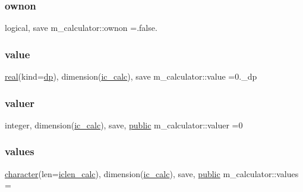 \mbox{\label{namespacem__calculator_a64ba59ad27c2751b72b5880500985b56}} 
\subsubsection{\texorpdfstring{ownon}{ownon}}
{\footnotesize\ttfamily logical, save m\+\_\+calculator\+::ownon =.false.\hspace{0.3cm}{\ttfamily [private]}}

\mbox{\label{namespacem__calculator_aeaff519ae0f18ac99095c955fbe12f9d}} 
\subsubsection{\texorpdfstring{value}{value}}
{\footnotesize\ttfamily \hyperlink{read__watch_83_8txt_abdb62bde002f38ef75f810d3a905a823}{real}(kind=\hyperlink{namespacem__calculator_aefb5a6c3001bb0f09ed82decb6def950}{dp}), dimension(\hyperlink{namespacem__calculator_a462e5bf8d038196149ba96c22a614284}{ic\+\_\+calc}), save m\+\_\+calculator\+::value =0.\+\_\+dp\hspace{0.3cm}{\ttfamily [private]}}

\mbox{\label{namespacem__calculator_a7d1d50fdb797826d4722b3a6d2e38442}} 
\subsubsection{\texorpdfstring{valuer}{valuer}}
{\footnotesize\ttfamily integer, dimension(\hyperlink{namespacem__calculator_a462e5bf8d038196149ba96c22a614284}{ic\+\_\+calc}), save, \hyperlink{M__stopwatch_83_8txt_a2f74811300c361e53b430611a7d1769f}{public} m\+\_\+calculator\+::valuer =0}

\mbox{\label{namespacem__calculator_ad2574ef504a32d93ad0c76a9a8e1c626}} 
\subsubsection{\texorpdfstring{values}{values}}
{\footnotesize\ttfamily \hyperlink{option__stopwatch_83_8txt_abd4b21fbbd175834027b5224bfe97e66}{character}(len=\hyperlink{namespacem__calculator_accf705491e8bd9b3d2f0d04fd13712e7}{iclen\+\_\+calc}), dimension(\hyperlink{namespacem__calculator_a462e5bf8d038196149ba96c22a614284}{ic\+\_\+calc}), save, \hyperlink{M__stopwatch_83_8txt_a2f74811300c361e53b430611a7d1769f}{public} m\+\_\+calculator\+::values =\textquotesingle{} \textquotesingle{}}

